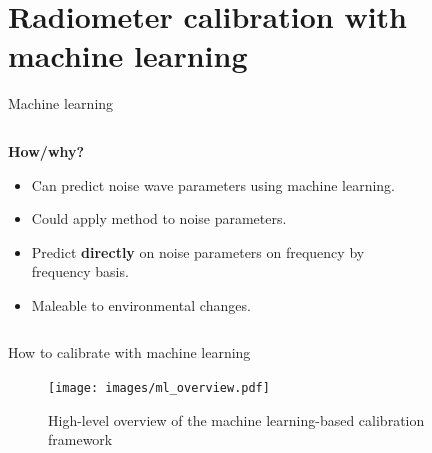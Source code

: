\documentclass[aspectratio=169]{beamer}
\begin{document}
\section{Radiometer calibration with machine learning}
\begin{frame}{\small{Machine learning}}
	\begin{columns}
		\begin{column}{0.35\textwidth}
			\textbf{How/why?}
			\begin{itemize}
				\item Can predict noise wave parameters using machine learning.
				\item Could apply method to noise parameters.
				\item Predict \textbf{directly} on noise parameters on frequency by frequency basis.
				\item Maleable to environmental changes.
			\end{itemize}
		\end{column}
		\begin{column}{0.65\textwidth}
			\begin{figure}[h]
				
			\end{figure}
		\end{column}
	\end{columns}
\end{frame}

\begin{frame}{\small{How to calibrate with machine learning}}
	\begin{figure}[h]
		\centering
		\texttt{[image: images/ml\_overview.pdf]}
		\caption{High-level overview of the machine learning-based calibration framework}
	\end{figure}
\end{frame}
\end{document}
